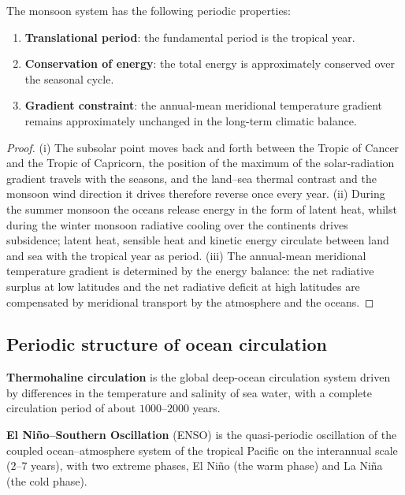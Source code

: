 \begin{proposition}\label{prop:monsoon_periodicity}
The monsoon system has the following periodic properties:
\begin{enumerate}[label=(\roman*)]
    \item \textbf{Translational period}: the fundamental period is the tropical year.
    \item \textbf{Conservation of energy}: the total energy is approximately conserved over the seasonal cycle.
    \item \textbf{Gradient constraint}: the annual-mean meridional temperature gradient remains approximately unchanged in the long-term climatic balance.
\end{enumerate}
\end{proposition}

\begin{proof}
(i) The subsolar point moves back and forth between the Tropic of Cancer and the Tropic of Capricorn, the position of the maximum of the solar-radiation gradient travels with the seasons, and the land--sea thermal contrast and the monsoon wind direction it drives therefore reverse once every year.
(ii) During the summer monsoon the oceans release energy in the form of latent heat, whilst during the winter monsoon radiative cooling over the continents drives subsidence; latent heat, sensible heat and kinetic energy circulate between land and sea with the tropical year as period.
(iii) The annual-mean meridional temperature gradient is determined by the energy balance: the net radiative surplus at low latitudes and the net radiative deficit at high latitudes are compensated by meridional transport by the atmosphere and the oceans.
\end{proof}

\subsection{Periodic structure of ocean circulation}

\begin{definition}\label{def:thermohaline_circulation}
\textbf{Thermohaline circulation} is the global deep-ocean circulation system driven by differences in the temperature and salinity of sea water, with a complete circulation period of about $1000$--$2000$ years.
\end{definition}

\begin{definition}\label{def:enso_geo}
\textbf{El Ni\~no--Southern Oscillation} (ENSO) is the quasi-periodic oscillation of the coupled ocean--atmosphere system of the tropical Pacific on the interannual scale ($2$--$7$ years), with two extreme phases, El Ni\~no (the warm phase) and La Ni\~na (the cold phase).
\end{definition}

